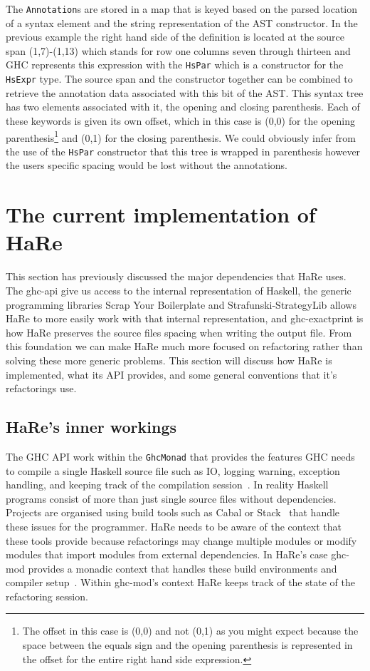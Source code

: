The \texttt{Annotation}s are stored in a map that is keyed based on the parsed location of a syntax element and the string representation of the AST constructor. In the previous example the right hand side of the definition is located at the source span (1,7)-(1,13) which stands for row one columns seven through thirteen and GHC represents this expression with the \texttt{HsPar} which is a constructor for the \texttt{HsExpr} type. The source span and the constructor together can be combined to retrieve the annotation data associated with this bit of the AST. This syntax tree has two elements associated with it, the opening and closing parenthesis. Each of these keywords is given its own offset, which in this case is (0,0) for the opening parenthesis\footnote{The offset in this case is (0,0) and not (0,1) as you might expect because the space between the equals sign and the opening parenthesis is represented in the offset for the entire right hand side expression.} and (0,1) for the closing parenthesis. We could obviously infer from the use of the \texttt{HsPar} constructor that this tree is wrapped in parenthesis however the users specific spacing would be lost without the annotations.  

\section{The current implementation of HaRe}

This section has previously discussed the major dependencies that HaRe uses. The ghc-api give us access to the internal representation of Haskell, the generic programming libraries Scrap Your Boilerplate and Strafunski-StrategyLib allows HaRe to more easily work with that internal representation, and ghc-exactprint is how HaRe preserves the source files spacing when writing the output file. From this foundation we can make HaRe much more focused on refactoring rather than solving these more generic problems. This section will discuss how HaRe is implemented, what its API provides, and some general conventions that it's refactorings use.

\subsection{HaRe's inner workings}\label{hareInners}

The GHC API work within the \texttt{GhcMonad} that provides the features GHC needs to compile a single Haskell source file such as IO, logging warning, exception handling, and keeping track of the compilation session~\citep{ghcApi}. In reality Haskell programs consist of more than just single source files without dependencies. Projects are organised using build tools such as Cabal or Stack~\citep{cabal,stack} that handle these issues for the programmer. HaRe needs to be aware of the context that these tools provide because refactorings may change multiple modules or modify modules that import modules from external dependencies. In HaRe's case ghc-mod provides a monadic context that handles these build environments and compiler setup~\citep{ghcMod}. Within ghc-mod's context HaRe keeps track of the state of the refactoring session.

